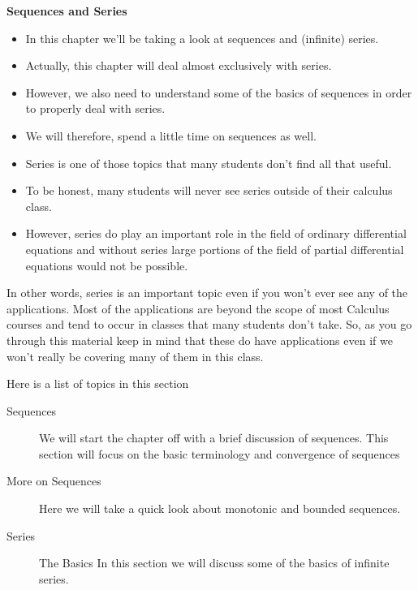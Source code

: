 \documentclass[]{report}
\begin{document}
	
	\textbf{Sequences and Series}\\
	\begin{itemize}
\item In this chapter we’ll be taking a look at sequences and (infinite) series. 
\item Actually, this chapter will deal almost exclusively with series. 
\item However, we also need to understand some of the basics of sequences in order to properly deal with series.  
\item We will therefore, spend a little time on sequences as well.
\end{itemize}


	
	\begin{itemize}
		\item  Series is one of those topics that many students don’t find all that useful. \item To be honest, many students will never see series outside of their calculus class. \item However, series do play an important role in the field of ordinary differential equations and without series large portions of the field of partial differential equations would not be possible.
\end{itemize}


	
In other words, series is an important topic even if you won’t ever see any of the applications.  Most of the applications are beyond the scope of most Calculus courses and tend to occur in classes that many students don’t take.  So, as you go through this material keep in mind that these do have applications even if we won’t really be covering many of them in this class.
 


	
Here is a list of topics in this section
 
\begin{description}
	\item[Sequences ] We will start the chapter off with a brief discussion of sequences.  This section will focus on the basic terminology and convergence of sequences
 
\item[More on Sequences]  Here we will take a quick look about monotonic and bounded sequences.
 
\item[Series]  The Basics  In this section we will discuss some of the basics of infinite series.
\end{description}
\end{document}

